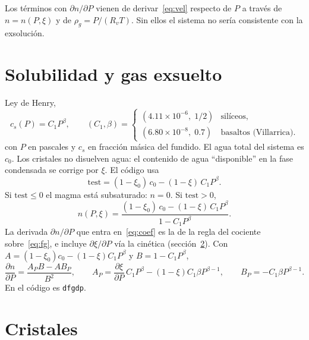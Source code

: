 \documentclass[11pt,a4paper]{article}
\newcommand{\p}{\partial}
\newcommand{\Rv}{R_v}
\begin{document}
Los términos con $\p n/\p P$ vienen de derivar~\eqref{eq:vel} respecto
de $P$ a través de $n=n(P,\xi)$ y de $\rho_g=P/(\Rv T)$. Sin ellos el
sistema no sería consistente con la exsolución.

\section{Solubilidad y gas exsuelto}
\label{sec:sol}

Ley de Henry,
\begin{equation}
\label{eq:henry}
c_s(P)=C_1 P^\beta,
\qquad
(C_1,\beta)
=\begin{cases}
(4.11\times10^{-6},\;1/2) & \text{silíceos},\\
(6.80\times10^{-8},\;0.7) & \text{basaltos (Villarrica)}.
\end{cases}
\end{equation}
con $P$ en pascales y $c_s$ en fracción másica del fundido. El agua
total del sistema es $c_0$. Los cristales no disuelven agua: el
contenido de agua ``disponible'' en la fase condensada se corrige por
$\xi$. El código usa
\begin{equation}
\label{eq:test}
\mathrm{test}
=(1-\xi_0)\,c_0-(1-\xi)\,C_1 P^\beta.
\end{equation}
Si $\mathrm{test}\le0$ el magma está subsaturado: $n=0$. Si
$\mathrm{test}>0$,
\begin{equation}
\label{eq:fg}
n(P,\xi)
=\frac{(1-\xi_0)\,c_0-(1-\xi)\,C_1 P^\beta}{1-C_1 P^\beta}.
\end{equation}
La derivada $\p n/\p P$ que entra en~\eqref{eq:coef} es la de la
regla del cociente sobre~\eqref{eq:fg}, e incluye
$\p\xi/\p P$ vía la cinética (sección~\ref{sec:xtal}). Con
$A=(1-\xi_0)c_0-(1-\xi)C_1P^\beta$ y $B=1-C_1P^\beta$,
\begin{equation}
\frac{\p n}{\p P}
=\frac{A_P B-A B_P}{B^2},
\qquad
A_P=\frac{\p\xi}{\p P}\,C_1P^\beta-(1-\xi)C_1\beta P^{\beta-1},
\qquad
B_P=-C_1\beta P^{\beta-1}.
\end{equation}
En el código es \texttt{dfgdp}.

\section{Cristales}
\label{sec:xtal}
\end{document}
